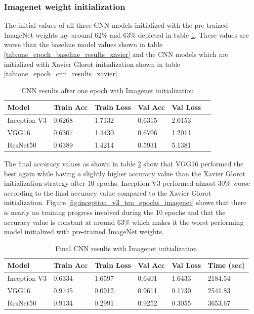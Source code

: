 \documentclass{article}
\theoremstyle{definition}
\theoremstyle{remark}
\begin{document}
\subsubsection{Imagenet weight initialization}

The initial values of all three CNN models initialized with the pre-trained ImageNet weights lay around 62\% and 63\% depicted in table \ref{tab:one_epoch_cnn_results_imagenet}. These values are worse than the baseline model values shown in table \ref{tab:one_epoch_baseline_results_xavier} and the CNN models which are initialized with Xavier Glorot initialization shown in table \ref{tab:one_epoch_cnn_results_xavier}.


\begin{table}[h!]
\center
\begin{tabular}{|l|l|l|l|l|l|}
\hline
\textbf{Model} & \textbf{Train Acc} & \textbf{Train Loss} & \textbf{Val Acc} & \textbf{Val Loss}\\ \hline
Inception V3 & 0.6268  		 & 1.7132  	 & 0.6315	& 2.0153	\\ \hline
VGG16  		& 0.6307  	 	 & 1.4430    & 0.6706	&	1.2011 \\ \hline
ResNet50  	& 0.6389  	  	 & 1.4214  	 & 0.5931	&	5.1381\\ \hline
\end{tabular}
\caption{CNN results after one epoch with Imagenet initialization}
\label{tab:one_epoch_cnn_results_imagenet}
\end{table}

The final accuracy values as shown in table \ref{tab:final_cnn_results_imagenet} show that VGG16 performed the best again while having a slightly higher accuracy value than the Xavier Glorot initialization strategy after 10 epochs. Inception V3 performed almost 30\% worse according to the final accuracy value compared to the Xavier Glorot initialization. Figure \ref{fig:inception_v3_ten_epochs_imagenet} shows that there is nearly no training progress involved during the 10 epochs and that the accuracy value is constant at around 63\% which makes it the worst performing model initialized with pre-trained ImageNet weights.

\begin{table}[h!]
\center
\begin{tabular}{|l|l|l|l|l|l|}
\hline
\textbf{Model} & \textbf{Train Acc} & \textbf{Train Loss} & \textbf{Val Acc} & \textbf{Val Loss} & \textbf{Time (sec)}\\ \hline
 Inception V3	& 0.6334  & 1.6597  & 0.6401	& 1.6433 &	2184.54\\ \hline
 VGG16  		& 0.9745  	 	 & 0.0912      & 0.9611	  	  &	0.1730 	 & 2541.83\\ \hline     
 ResNet50  	& 0.9134  	  	& 0.2991  	   & 0.9252	 	  &	0.3055	 &  3653.67\\ \hline
\end{tabular}
\caption{Final CNN results with Imagenet initialization}
\label{tab:final_cnn_results_imagenet}
\end{table}
\end{document}
